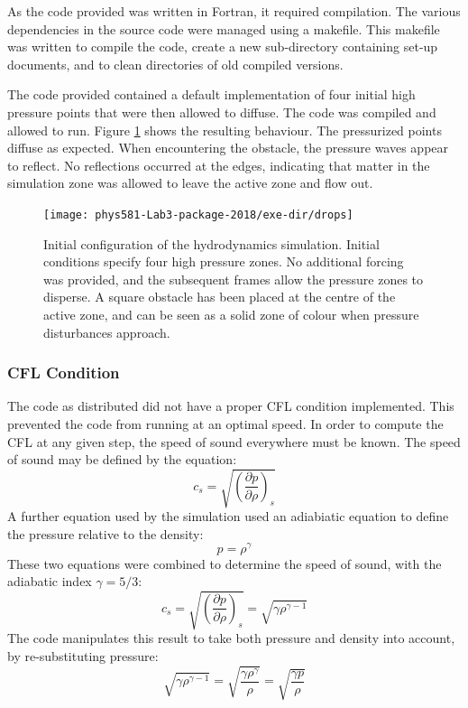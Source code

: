 \documentclass[twocolumn]{article}
\begin{document}
As the code provided was written in Fortran, it required compilation. The various dependencies in the source code were managed using a makefile. This makefile was written to compile the code, create a new sub-directory containing set-up documents, and to clean directories of old compiled versions. 

The code provided contained a default implementation of four initial high pressure points that were then allowed to diffuse. The code was compiled and allowed to run. Figure \ref{fig:drops} shows the resulting behaviour. The pressurized points diffuse as expected. When encountering the obstacle, the pressure waves appear to reflect. No reflections occurred at the edges, indicating that matter in the simulation zone was allowed to leave the active zone and flow out.

\begin{figure}
\centering
\texttt{[image: phys581-Lab3-package-2018/exe-dir/drops]}
\caption{Initial configuration of the hydrodynamics simulation. Initial conditions specify four high pressure zones. No additional forcing was provided, and the subsequent frames allow the pressure zones to disperse. A square obstacle has been placed at the centre of the active zone, and can be seen as a solid zone of colour when pressure disturbances approach.}
\label{fig:drops}
\end{figure}

\subsubsection{CFL Condition}
The code as distributed did not have a proper CFL condition implemented. This prevented the code from running at an optimal speed. In order to compute the CFL at any given step, the speed of sound everywhere must be known. The speed of sound may be defined by the equation:
\begin{equation}
c_s = \sqrt{(\frac{\partial p}{\partial \rho})_s}
\end{equation}
A further equation used by the simulation used an adiabiatic equation to define the pressure relative to the density:
\begin{equation}
p = \rho^\gamma
\end{equation}
These two equations were combined to determine the speed of sound, with the adiabatic index $\gamma = 5/3$:
\begin{equation}
c_s = \sqrt{(\frac{\partial p}{\partial \rho})_s} = \sqrt{\gamma \rho^{\gamma-1}}
\end{equation}
The code manipulates this result to take both pressure and density into account, by re-substituting pressure:
\begin{equation}
\sqrt{\gamma \rho^{\gamma-1}} = \sqrt{\frac{\gamma \rho^\gamma}{\rho}} = \sqrt{\frac{\gamma p}{\rho}}
\end{equation}
\end{document}
